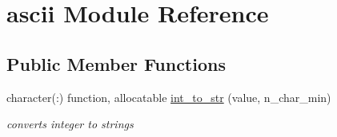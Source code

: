 \hypertarget{classascii}{\section{ascii Module Reference}
\label{classascii}
}
\subsection*{Public Member Functions}
\begin{DoxyCompactItemize}
\item 
character(\-:) function, allocatable \hyperlink{classascii_ac1af533da26d2edb9b152ec358a01b98}{int\-\_\-to\-\_\-str} (value, n\-\_\-char\-\_\-min)
\begin{DoxyCompactList}\small\item\em converts integer to strings \end{DoxyCompactList}\end{DoxyCompactItemize}
